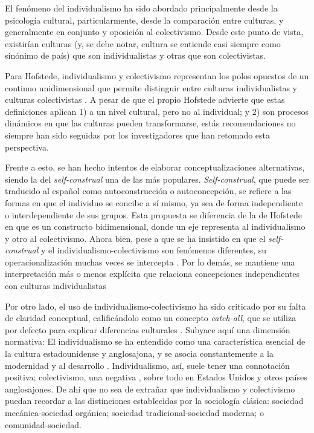 \documentclass[12pt,twoside]{templates/facsothesis}
\begin{document}
El fenómeno del individualismo ha sido abordado principalmente desde la psicología cultural, particularmente, desde la comparación entre culturas, y generalmente en conjunto y oposición al colectivismo. Desde este punto de vista, existirían culturas (y, se debe notar, cultura se entiende casi siempre como sinónimo de país) que son individualistas y otras que son colectivistas.

Para Hofstede, individualismo y colectivismo representan los polos opuestos de un continuo unidimensional que permite distinguir entre culturas individualistas y culturas colectivistas \citep{yoon2010}. A pesar de que el propio Hofstede advierte que estas definiciones aplican 1) a un nivel cultural, pero no al individual; y 2) son procesos dinámicos en que las culturas pueden transformarse, estás recomendaciones no siempre han sido seguidas por los investigadores que han retomado esta perspectiva.

Frente a esto, se han hecho intentos de elaborar conceptualizaciones alternativas, siendo la del \emph{self-construal} \citep{cross2011} una de las más populares. \emph{Self-construal}, que puede ser traducido al español como autoconstrucción o autoconcepción, se refiere a las formas en que el individuo se concibe a sí mismo, ya sea de forma independiente o interdependiente de sus grupos. Esta propuesta se diferencia de la de Hofstede en que es un constructo bidimensional, donde un eje representa al individualismo y otro al colectivismo. Ahora bien, pese a que se ha insistido en que el \emph{self-construal} y el individualismo-colectivismo son fenómenos diferentes, su operacionalización muchas veces se intercepta \citep{cross2011}. Por lo demás, se mantiene una interpretación más o menos explícita que relaciona concepciones independientes con culturas individualistas \citep{cross2011, voronov2002}

Por otro lado, el uso de individualismo-colectivismo ha sido criticado por su falta de claridad conceptual, calificándolo como un concepto \emph{catch-all}, que se utiliza por defecto para explicar diferencias culturales \citep{voronov2002}. Subyace aquí una dimensión normativa: El individualismo se ha entendido como una característica esencial de la cultura estadounidense y anglosajona, y se asocia constantemente a la modernidad y al desarrollo \citep{voronov2002, wang2010, martuccelli2010}. Individualismo, así, suele tener una connotación positiva; colectivismo, una negativa \citep{moemeka1998}, sobre todo en Estados Unidos y otros países anglosajones. De ahí que no sea de extrañar que individualismo y colectivismo puedan recordar a las distinciones establecidas por la sociología clásica: sociedad mecánica-sociedad orgánica; sociedad tradicional-sociedad moderna; o comunidad-sociedad.
\end{document}
